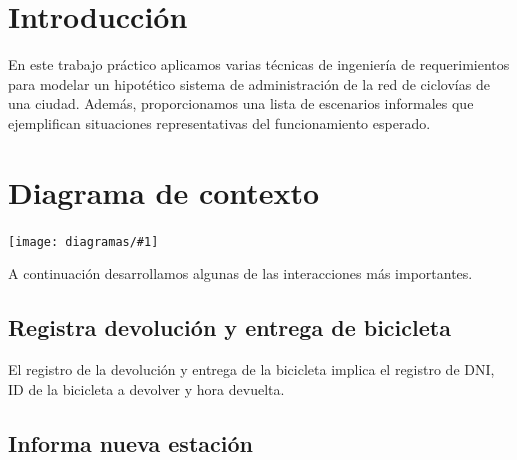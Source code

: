 \documentclass[a4paper, 10pt, twoside]{article}
\newcommand{\diagramah}[1]{
  \texttt{[image: diagramas/\#1]}
}
\begin{document}
\newpage




\tableofcontents

\newpage




\section{Introducción}

En este trabajo práctico aplicamos varias técnicas de ingeniería de requerimientos para modelar un hipotético sistema de administración de la red de ciclovías de una ciudad. Además, proporcionamos una lista de escenarios informales que ejemplifican situaciones representativas del funcionamiento esperado.




\section{Diagrama de contexto}

\diagramah{contexto}

A continuación desarrollamos algunas de las interacciones más importantes.


\subsection{Registra devolución y entrega de bicicleta}

El registro de la devolución y entrega de la bicicleta implica el registro de DNI, ID de la bicicleta a devolver y hora devuelta.

\subsection{Informa nueva estación}
\end{document}
